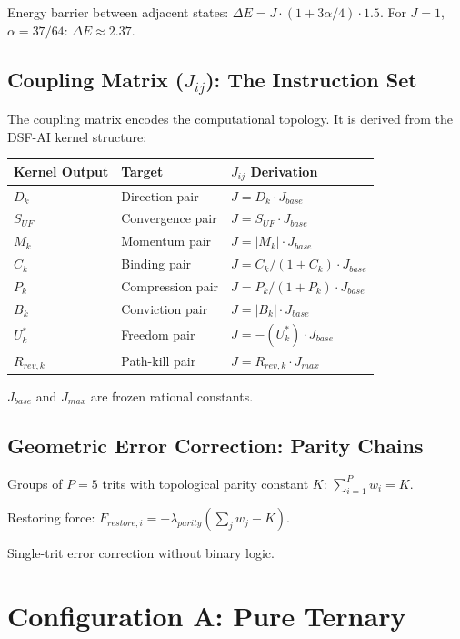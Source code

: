\documentclass[11pt, a4paper]{report}
\begin{document}
Energy barrier between adjacent states:
$\Delta E = J \cdot (1 + 3\alpha/4) \cdot 1.5$.
For $J = 1$, $\alpha = 37/64$: $\Delta E \approx 2.37$.

\section{Coupling Matrix ($J_{ij}$): The Instruction Set}

The coupling matrix encodes the computational topology. It is derived
from the DSF-AI kernel structure:

\begin{center}
\begin{tabular}{@{}lll@{}}
\toprule
\textbf{Kernel Output} & \textbf{Target} & \textbf{$J_{ij}$ Derivation} \\
\midrule
$D_k$ & Direction pair & $J = D_k \cdot J_{base}$ \\
$S_{UF}$ & Convergence pair & $J = S_{UF} \cdot J_{base}$ \\
$M_k$ & Momentum pair & $J = |M_k| \cdot J_{base}$ \\
$C_k$ & Binding pair & $J = C_k/(1+C_k) \cdot J_{base}$ \\
$P_k$ & Compression pair & $J = P_k/(1+P_k) \cdot J_{base}$ \\
$B_k$ & Conviction pair & $J = |B_k| \cdot J_{base}$ \\
$U^*_k$ & Freedom pair & $J = -(U^*_k) \cdot J_{base}$ \\
$R_{rev,k}$ & Path-kill pair & $J = R_{rev,k} \cdot J_{max}$ \\
\bottomrule
\end{tabular}
\end{center}

$J_{base}$ and $J_{max}$ are frozen rational constants.

\section{Geometric Error Correction: Parity Chains}

Groups of $P = 5$ trits with topological parity constant $K$:
$\sum_{i=1}^{P} w_i = K$.

Restoring force: $F_{restore,i} = -\lambda_{parity}(\sum_j w_j - K)$.

Single-trit error correction without binary logic.

\chapter{Configuration A: Pure Ternary}
\end{document}
